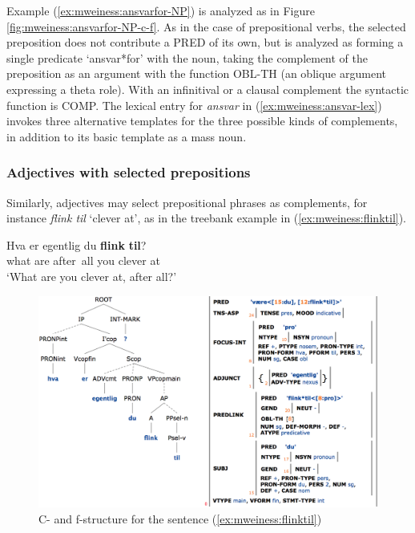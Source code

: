 \documentclass[output=paper]{langsci/langscibook}
\begin{document}
Example (\ref{ex:mweiness:ansvarfor-NP}) is analyzed as in Figure \ref{fig:mweiness:ansvarfor-NP-c-f}.
As in the case of prepositional verbs, the selected preposition does not contribute a PRED of its own, but is analyzed as forming a single predicate `ansvar*for' with the noun, taking the complement of the preposition as an argument with the function OBL-TH (an oblique argument expressing a theta role).
With an infinitival or a clausal complement the syntactic function is COMP.
The lexical entry for \textit{ansvar} in (\ref{ex:mweiness:ansvar-lex}) invokes three alternative templates for the three possible kinds of complements, in addition to its basic template as a mass noun.


\subsubsection{Adjectives with selected prepositions}\label{sec:mweiness:prepadj}

Similarly, adjectives may select prepositional phrases as complements, for instance \textit{flink til} `clever at', as in the treebank example in (\ref{ex:mweiness:flinktil}).

\ea\label{ex:mweiness:flinktil}
\gll Hva er egentlig du \textbf{flink} \textbf{til}? \\
     what are after all you clever at\\
\glt `What are you clever at, after all?'
\z

\begin{figure}
  \includegraphics[width=\textwidth]{figures/flinktil-c-f.png}
  \caption{C- and f-structure for the sentence  (\ref{ex:mweiness:flinktil}) }
  \label{fig:mweiness:flinktil-c-f}
\end{figure}
\end{document}
